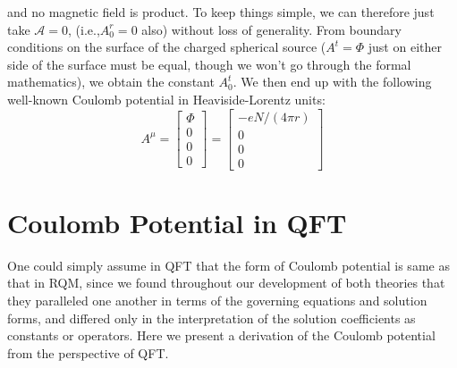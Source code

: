 and no magnetic field is product. To keep things simple, we can therefore just take $\mathcal{A}=0$, (i.e.,$A_0^{r}=0$ also) without loss of generality. From boundary conditions on the surface of the charged spherical source ($A^t=\Phi$ just on either side of the surface must be equal, though we won't go through the formal mathematics), we obtain the constant $A_0^t$. We then end up with the following well-known Coulomb potential in Heaviside-Lorentz units:
\begin{equation}A^{\mu}=\left[\begin{array}{c}
\Phi \\
0 \\
0 \\
0
\end{array}\right]=\left[\begin{array}{c}
-e N /(4 \pi r) \\
0 \\
0 \\
0
\end{array}\right]\end{equation}

\section{Coulomb Potential in QFT}
One could simply assume in QFT that the form of Coulomb potential is same as that in RQM, since we found throughout our development of both theories that they paralleled one another in terms of the governing equations and solution forms, and differed only in the interpretation of the solution coefficients as constants or operators. Here we present a derivation of the Coulomb potential from the perspective of QFT.
